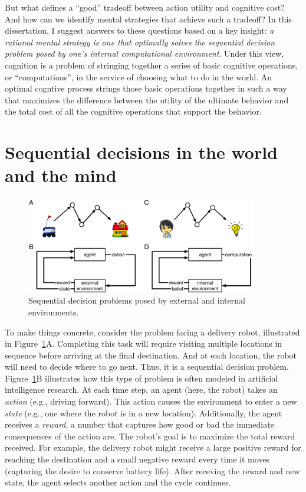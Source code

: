 But what defines a ``good'' tradeoff between action utility and cognitive cost? And how can we identify mental strategies that achieve such a tradeoff? In this dissertation, I suggest answers to these questions based on a key insight: \emph{a rational mental strategy is one that optimally solves the sequential decision problem posed by one's internal computational environment}. Under this view, cognition is a problem of stringing together a series of basic cognitive operations, or ``computations'', in the service of choosing what to do in the world. An optimal cogntive process strings those basic operations together in such a way that maximizes the difference between the utility of the ultimate behavior and the total cost of all the cognitive operations that support the behavior.


\section{Sequential decisions in the world and the mind}

\begin{figure}[t]
  \centering
  \includegraphics[width=0.9\textwidth]{diagrams/sequential-intuition.pdf}
  \caption{Sequential decision problems posed by external and internal environments.}
  \label{fig:sequential-intuition}
\end{figure}


To make things concrete, consider the problem facing a delivery robot, illustrated in Figure~\ref{fig:sequential-intuition}A. Completing this task will require visiting multiple locations in sequence before arriving at the final destination. And at each location, the robot will need to decide where to go next. Thus, it is a sequential decision problem. Figure~\ref{fig:sequential-intuition}B illustrates how this type of problem is often modeled in artificial intelligence research. At each time step, an agent (here, the robot) takes an \emph{action} (e.g., driving forward). This action causes the environment to enter a new \emph{state} (e.g., one where the robot is in a new location). Additionally, the agent receives a \emph{reward}, a number that captures how good or bad the immediate consequences of the action are. The robot's goal is to maximize the total reward received. For example, the delivery robot might receive a large positive reward for reaching the destination and a small negative reward every time it moves (capturing the desire to conserve battery life). After receving the reward and new state, the agent selects another action and the cycle continues.


